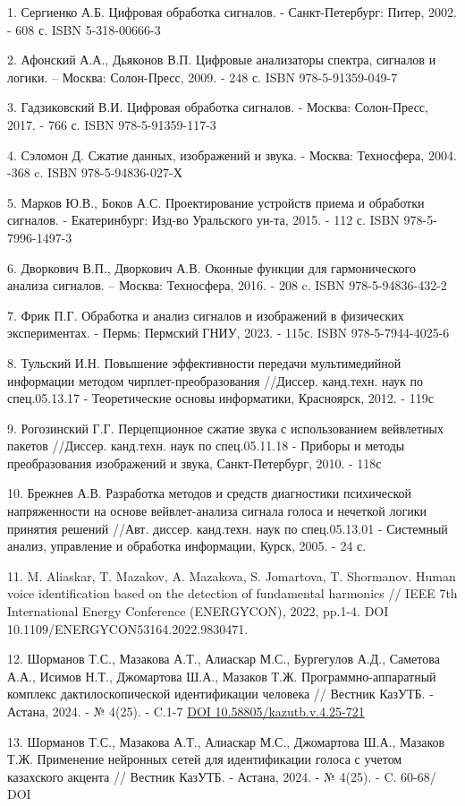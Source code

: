 \begin{references}
1. Сергиенко А.Б. Цифровая обработка сигналов. - Санкт-Петербург: Питер,
2002. - 608 с. ISBN 5-318-00666-3

2. Афонский А.А., Дьяконов В.П. Цифровые анализаторы спектра, сигналов и
логики. -- Москва: Солон-Пресс, 2009. - 248 с. ISBN 978-5-91359-049-7

3. Гадзиковский В.И. Цифровая обработка сигналов. - Москва: Солон-Пресс,
2017. - 766 с. ISBN 978-5-91359-117-3

4. Сэломон Д. Сжатие данных, изображений и звука. - Москва: Техносфера,
2004. -368 c. ISBN 978-5-94836-027-Х

5. Марков Ю.В., Боков А.С. Проектирование устройств приема и обработки
сигналов. - Екатеринбург: Изд-во Уральского ун-та, 2015. - 112 с. ISBN
978-5-7996-1497-3

6. Дворкович В.П., Дворкович А.В. Оконные функции для гармонического
анализа сигналов. -- Москва: Техносфера, 2016. - 208 c. ISBN
978-5-94836-432-2

7. Фрик П.Г. Обработка и анализ сигналов и изображений в физических
экспериментах. - Пермь: Пермский ГНИУ, 2023. - 115с. ISBN
978-5-7944-4025-6

8. Тульский И.Н. Повышение эффективности передачи мультимедийной
информации методом чирплет-преобразования //Диссер. канд.техн. наук по
спец.05.13.17 - Теоретические основы информатики, Красноярск, 2012. -
119с

9. Рогозинский Г.Г. Перцепционное сжатие звука с использованием
вейвлетных пакетов //Диссер. канд.техн. наук по спец.05.11.18 - Приборы
и методы преобразования изображений и звука, Санкт-Петербург, 2010. -
118с

10. Брежнев А.В. Разработка методов и средств диагностики психической
напряженности на основе вейвлет-анализа сигнала голоса и нечеткой логики
принятия решений //Авт. диссер. канд.техн. наук по спец.05.13.01 -
Системный анализ, управление и обработка информации, Курск, 2005. - 24
с.

11. M. Aliaskar, T. Mazakov, A. Mazakova, S. Jomartova, T. Shormanov.
Human voice identification based on the detection of fundamental
harmonics // IEEE 7th International Energy Conference
(ENERGYCON)\emph{,} 2022, pp.1-4. DOI
10.1109/ENERGYCON53164.2022.9830471.

12. Шорманов Т.С., Мазакова А.Т., Алиаскар М.С., Бургегулов А.Д.,
Саметова А.А., Исимов Н.Т., Джомартова Ш.А., Мазаков Т.Ж.
Программно-аппаратный комплекс дактилоскопической идентификации человека
// Вестник КазУТБ. - Астана, 2024. - № 4(25). - C.1-7
\href{https://doi.org/10.58805/kazutb.v.4.25-721}{DOI
10.58805/kazutb.v.4.25-721}

13. Шорманов Т.С., Мазакова А.Т., Алиаскар М.С., Джомартова Ш.А., Мазаков
Т.Ж. Применение нейронных сетей для идентификации голоса с учетом
казахского акцента // Вестник КазУТБ. - Астана, 2024. - № 4(25). - C.
60-68/ DOI
\href{https://doi.org/10.58805/kazutb.v.4.25-720}{}
\end{references}

